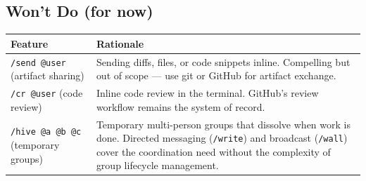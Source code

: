 \documentclass[11pt,letterpaper]{article}
\begin{document}
\subsection*{Won't Do (for now)}

\renewcommand{\arraystretch}{1.4}
\begin{tabularx}{\textwidth}{@{}l X@{}}
  \toprule
  \textbf{Feature} & \textbf{Rationale} \\
  \midrule

  \texttt{/send @user} (artifact sharing) &
  Sending diffs, files, or code snippets inline. Compelling but out of
  scope --- use git or GitHub for artifact exchange. \\

  \texttt{/cr @user} (code review) &
  Inline code review in the terminal. GitHub's review workflow remains the
  system of record. \\

  \texttt{/hive @a @b @c} (temporary groups) &
  Temporary multi-person groups that dissolve when work is done. Directed
  messaging (\texttt{/write}) and broadcast (\texttt{/wall})
  cover the coordination need
  without the complexity of group lifecycle management. \\

  \bottomrule
\end{tabularx}
\end{document}

